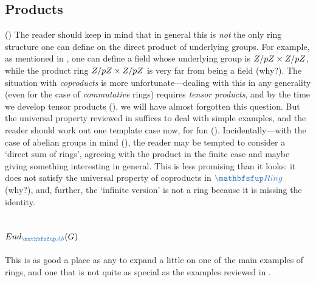 \subsection{Products}
\label{subsec:rings:products}
()
The reader should keep in mind that in general this is \emph{not} the
only ring structure one can define on the direct product of underlying
groups. For example, as mentioned in
,
one can define a field whose underlying group is
$Z/pZ \times Z/pZ$, while the product ring $Z/pZ \times Z/pZ$
is very far from being a field (why?).  The situation with
\emph{coproducts} is more unfortunate---dealing with this in any
generality (even for the case of \emph{commutative} rings) requires
\emph{tensor products}, and by the time we develop tensor products
(), we will
have almost forgotten this question. But the universal property
reviewed in
 suffices
to deal with simple examples, and the reader should work out one
template case now, for fun ().
Incidentally---with the case of abelian groups in mind
(), the reader may be tempted to
consider a `direct sum of rings', agreeing with the product in the
finite case and maybe giving something interesting in general. This is
less promising than it looks: it does not satisfy the universal
property of coproducts in $\categ{Ring}$ (why?), and, further, the
`infinite version' is not a ring because it is missing the identity.

\subsection{\texorpdfstring{$\End_{\categ{Ab}}(G)$}{End\_Ab(G)}}
\label{subsec:rings:endab-g}
This is as good a place as any to expand a little on one of the main
examples of rings, and one that is not quite as special as the
examples reviewed in
.

